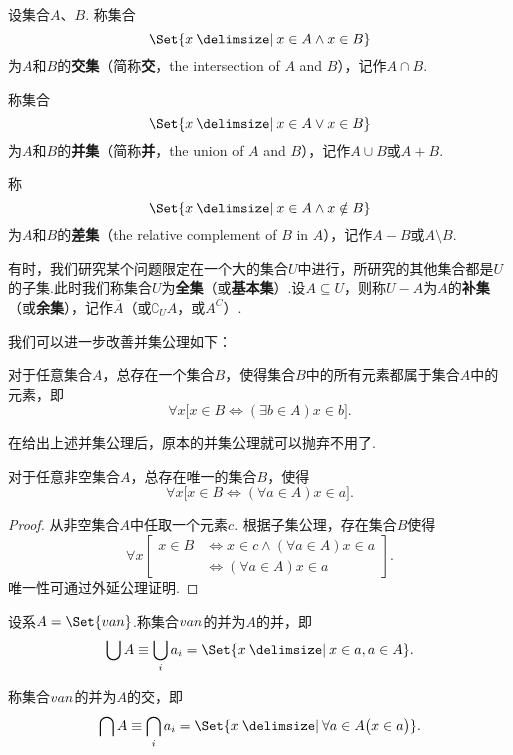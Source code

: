 \begin{definition}[集合的交、并、差]
设集合\(A\)、\(B\).
称集合\[
\Set{ x \given x \in A \land x \in B }
\]为\(A\)和\(B\)的\textbf{交集}（简称\textbf{交}，the intersection of \(A\) and \(B\)），记作\(A \cap B\).

称集合\[
\Set{ x \given x \in A \lor x \in B }
\]为\(A\)和\(B\)的\textbf{并集}（简称\textbf{并}，the union of \(A\) and \(B\)），记作\(A \cup B\)或\(A+B\).

称\[
\Set{ x \given x \in A \land x \notin B }
\]为\(A\)和\(B\)的\textbf{差集}（the relative complement of \(B\) in \(A\)），记作\(A - B\)或\(A \setminus B\).
\end{definition}

\begin{definition}[全集、补集]
有时，我们研究某个问题限定在一个大的集合\(U\)中进行，所研究的其他集合都是\(U\)的子集.此时我们称集合\(U\)为\textbf{全集}（或\textbf{基本集}）.设\(A \subseteq U\)，则称\(U-A\)为\(A\)的\textbf{补集}（或\textbf{余集}），记作\(\overline{A}\)（或\(\complement_U A\)，或\(A^C\)）.
\end{definition}

我们可以进一步改善并集公理如下：
\begin{axiom}[并集公理']
对于任意集合\(A\)，总存在一个集合\(B\)，使得集合\(B\)中的所有元素都属于集合\(A\)中的元素，即\[
\forall x \bigl[
	x \in B \iff (\exists b \in A) x \in b
\bigr].
\]
\end{axiom}
在给出上述并集公理后，原本的并集公理就可以抛弃不用了.

\begin{theorem}
对于任意非空集合\(A\)，总存在唯一的集合\(B\)，使得\[
\forall x \bigl[
	x \in B \iff (\forall a \in A) x \in a
\bigr].
\]
\begin{proof}
从非空集合\(A\)中任取一个元素\(c\).
根据子集公理，存在集合\(B\)使得\[
\forall x \left[
	\begin{array}{rl}
	x \in B &\iff x \in c \land (\forall a \in A) x \in a \\
		&\iff (\forall a \in A) x \in a
	\end{array}
\right].
\]唯一性可通过外延公理证明.
\end{proof}
\end{theorem}

\begin{definition}[系的并、交]
设系\(A = \Set{\v{a}{n}}\).称集合\(v{a}{n}\)的并为\(A\)的并，即\[
\bigcup A \equiv \bigcup\limits_i a_i
= \Set{ x \given x \in a, a \in A }.
\]

称集合\(v{a}{n}\)的并为\(A\)的交，即\[
\bigcap A \equiv \bigcap\limits_i a_i
= \Set{ x \given \forall a \in A \bigl(x \in a\bigr) }.
\]
\end{definition}


